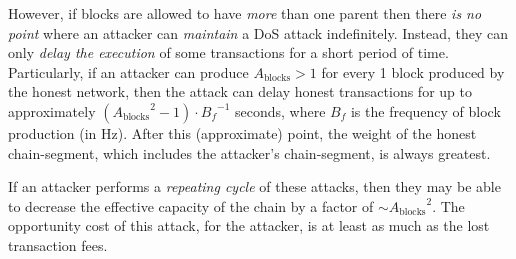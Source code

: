 However, if blocks are allowed to have \emph{more} than one parent then there \emph{is no point} where an attacker can \emph{maintain} a DoS attack indefinitely.
Instead, they can only \emph{delay the execution} of some transactions for a short period of time.
Particularly, if an attacker can produce $A_{\text{blocks}} > 1$ for every 1 block produced by the honest network, then the attack can delay honest transactions for up to approximately $({A_{\text{blocks}}}^2 - 1) \cdot {B_f}^{-1}$ seconds, where $B_f$ is the frequency of block production (in Hz).
After this (approximate) point, the weight of the honest chain-segment, which includes the attacker's chain-segment, is always greatest.

If an attacker performs a \emph{repeating cycle} of these attacks, then they may be able to decrease the effective capacity of the chain by a factor of $\sim {A_{\text{blocks}}}^2$. %
The opportunity cost of this attack, for the attacker, is at least as much as the lost transaction fees.
